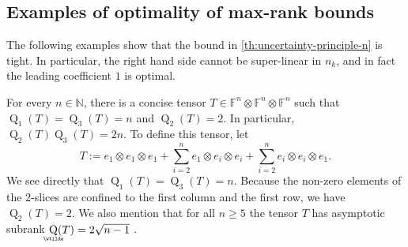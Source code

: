 \documentclass{daj}
\DeclareMathOperator{\subrank}{Q}
\DeclareMathOperator{\asympsubrank}{\underaccent{\wtilde}{Q}}
\newcommand{\FF}{\mathbb{F}}
\newcommand{\NN}{\mathbb{N}}
\begin{document}
%
%
%

%
%
%
%
%
%
%

%
%
%
%

%
%
%
%
%
%
%
%
%

%
%
%
%
%
%

%
%
%
%
%
%
%
%

%
%
%
%
%
%
%



%
%
%
%
%
%
%
    
%

%
%
%
%
%
%
%
%
%
%
    
%
%
    
%
%
%
%
%
%
%
%
%
%

%
%

%

%
%

%
%

\subsection{Examples of optimality of max-rank bounds}
The following examples show that the bound in \autoref{th:uncertainty-principle-n} is tight. In particular, the right hand side cannot be super-linear in $n_k$, and in fact the leading coefficient $1$ is optimal. %

\begin{example} \label{ex:strassenNullAlgebra}
%
%
%
%
For every $n \in \NN$,
there is a concise tensor $T \in \FF^n \otimes \FF^n \otimes \FF^n$ such that $\subrank_1(T) = \subrank_3(T) = n$ and $\subrank_2(T) = 2$. In particular, $\subrank_2(T) \subrank_3(T) = 2n$.
%
%
    To define this tensor, let
    \[T :=e_1\otimes e_1\otimes e_1 + \sum_{i=2}^n e_1\otimes e_i\otimes e_i + \sum_{i=2}^ne_i\otimes e_i\otimes e_1.\]
    We see directly that $\subrank_1(T) = \subrank_3(T) = n$. 
    Because the non-zero elements of the $2$-slices are confined to the first column and the first row, we have $\subrank_2(T)=2$. We also mention that for all $n\geq5$ the tensor $T$ has asymptotic subrank $\asympsubrank(T)=2\sqrt{n-1}$ \cite[page~169]{strassen1991degeneration}. %
\end{example}
\end{document}
